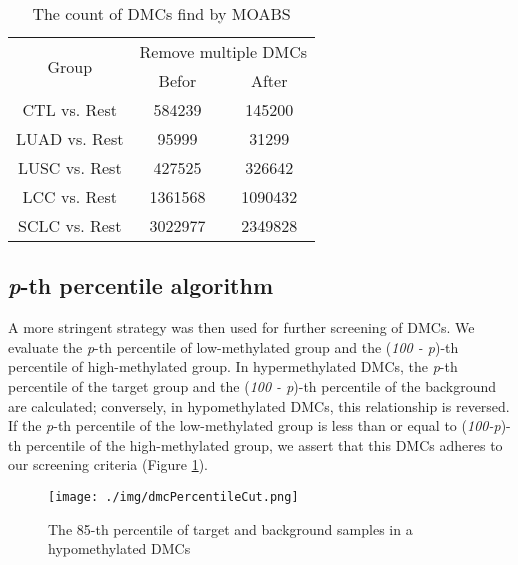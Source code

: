\documentclass[10pt]{article}
\begin{document}
\begin{table}[htbp]
    \begin{center}
        \caption{The count of DMCs find by MOABS}
        \begin{tabular}{|c|c|c|}
            \hline
            \multirow{2}{*}{Group} & \multicolumn{2}{c|}{Remove multiple DMCs}           \\
            \cline{2-3}            & Befor                                     & After   \\
            \hline
            CTL vs. Rest           & 584239                                    & 145200  \\
            LUAD vs. Rest          & 95999                                     & 31299   \\
            LUSC vs. Rest          & 427525                                    & 326642  \\
            LCC vs. Rest           & 1361568                                   & 1090432 \\
            SCLC vs. Rest          & 3022977                                   & 2349828 \\
            \hline
        \end{tabular}
    \end{center}
    \label{tab:table_dmc_ount}
\end{table}

\subsection{\textit{p}-th percentile algorithm}

A more stringent strategy was then used for further screening of DMCs. We evaluate the 
\textit{p}-th percentile of low-methylated group and the (\textit{100 - p})-th percentile
of high-methylated group. In hypermethylated DMCs, the \textit{p}-th percentile of the target
group and the (\textit{100 - p})-th percentile of the background are calculated; conversely,
in hypomethylated DMCs, this relationship is reversed. If the \textit{p}-th percentile of the
low-methylated group is less than or equal to (\textit{100-p})-th percentile of the high-methylated
group, we assert that this DMCs adheres to our screening criteria (Figure \ref*{fig:dmcPC}).

\begin{figure}[htbp]
    \centering
    \texttt{[image: ./img/dmcPercentileCut.png]}
    \caption{The 85-th percentile of target and background samples in a hypomethylated DMCs}
    \label{fig:dmcPC}
\end{figure}
\end{document}
